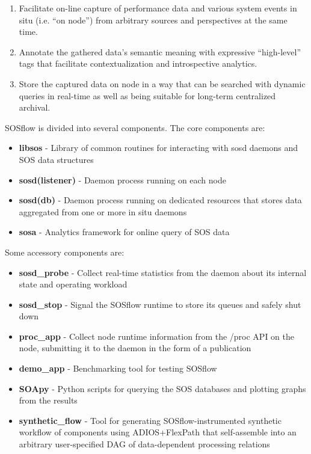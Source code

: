 \begin{enumerate}
\item Facilitate on-line capture of performance data and various system
  events in situ (i.e. ``on node'') from arbitrary sources and
  perspectives at the same time.
\item Annotate the gathered data's semantic meaning with expressive
  ``high-level'' tags that facilitate contextualization and
  introspective analytics.
\item Store the captured data on node in a way that can be searched
  with dynamic queries in real-time as well as being suitable for
  long-term centralized archival.
\end{enumerate}

SOSflow is divided into several components.  The core components are:
\begin{itemize}
\item \textbf{libsos} - Library of common routines for interacting with
      sosd daemons and SOS data structures
\item \textbf{sosd(listener)} - Daemon process running on each node
\item \textbf{sosd(db)} - Daemon process running on dedicated resources
      that stores data aggregated from one or more in situ daemons
\item \textbf{sosa} - Analytics framework for online query of SOS data
\end{itemize}

Some accessory components are:
\begin{itemize}
\item \textbf{sosd\_probe} - Collect real-time statistics from the daemon about
      its internal state and operating workload
\item \textbf{sosd\_stop} - Signal the SOSflow runtime to store its queues and
      safely shut down
\item \textbf{proc\_app} - Collect node runtime information from the /proc
      API on the node, submitting it to the daemon in the form of a publication
\item \textbf{demo\_app} - Benchmarking tool for testing SOSflow
\item \textbf{SOApy} - Python scripts for querying the SOS databases and plotting
      graphs from the results
\item \textbf{synthetic\_flow} - Tool for generating SOSflow-instrumented
      synthetic workflow of components using ADIOS+FlexPath
      that self-assemble into an arbitrary  user-specified DAG of
      data-dependent processing relations
\end{itemize}

